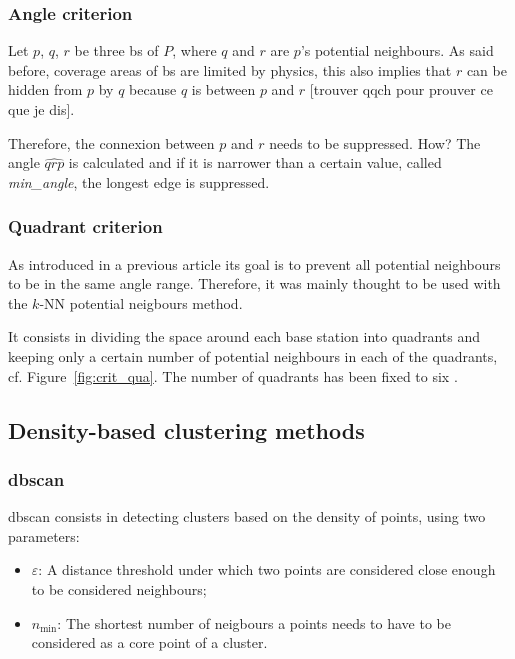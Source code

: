 \documentclass[lettersize,journal,english]{IEEEtran}
\begin{document}
        \subsubsection{Angle criterion}
            Let $p$, $q$, $r$ be three \acrshort{bs} of $P$, where $q$ and $r$ are $p$'s potential neighbours. As said before, coverage areas of \acrshort{bs} are limited by physics, this also implies that $r$ can be \og hidden\fg{} from $p$ by $q$ because $q$ is between $p$ and $r$ [trouver qqch pour prouver ce que je dis].

            Therefore, the connexion between $p$ and $r$ needs to be suppressed. How? The angle $\widehat{qrp}$ is calculated and if it is narrower than a certain value, called \emph{min\_angle}, the longest edge is suppressed.

        \subsubsection{Quadrant criterion}
            As introduced in a previous article \cite{10201211} its goal is to prevent all potential neighbours to be in the same angle range. Therefore, it was mainly thought to be used with the $k$-NN potential neigbours method.

            It consists in dividing the space around each base station into quadrants and keeping only a certain number of potential neighbours in each of the quadrants, cf. Figure~\ref{fig:crit_qua}.
            The number of quadrants has been fixed to six \cite{art_del_paq}.

    \subsection{Density-based clustering methods}
        \subsubsection{\acrshort{dbscan}}
            \acrshort{dbscan} consists in detecting clusters based on the density of points, using two parameters:
            \begin{itemize}
                \item \emph{$\varepsilon$}: A distance threshold under which two points are considered close enough to be considered neighbours;   
                \item \emph{$n_{\text{min}}$}: The shortest number of neigbours a points needs to have to be considered as a core point of a cluster.
            \end{itemize}
\end{document}
